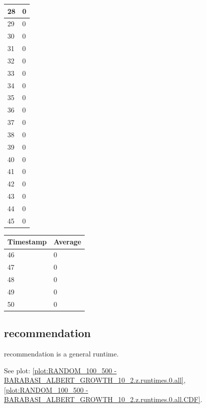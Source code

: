 \begin{tabular}{|l||l|}
	28 & 0 \\ \hline
	29 & 0 \\ \hline
	30 & 0 \\ \hline
	31 & 0 \\ \hline
	32 & 0 \\ \hline
	33 & 0 \\ \hline
	34 & 0 \\ \hline
	35 & 0 \\ \hline
	36 & 0 \\ \hline
	37 & 0 \\ \hline
	38 & 0 \\ \hline
	39 & 0 \\ \hline
	40 & 0 \\ \hline
	41 & 0 \\ \hline
	42 & 0 \\ \hline
	43 & 0 \\ \hline
	44 & 0 \\ \hline
	45 & 0 \\ \hline
\end{tabular}
\begin{tabular}{|l||l|}
\hline
	\textbf{Timestamp} & \textbf{Average} \\ \hline
	46 & 0 \\ \hline
	47 & 0 \\ \hline
	48 & 0 \\ \hline
	49 & 0 \\ \hline
	50 & 0 \\ \hline
\end{tabular}

\subsection{recommendation}
recommendation is a general runtime.

See plot: \ref{plot:RANDOM_100_500 - BARABASI_ALBERT_GROWTH_10_2.z.runtimes.0.all}, \ref{plot:RANDOM_100_500 - BARABASI_ALBERT_GROWTH_10_2.z.runtimes.0.all.CDF}.

